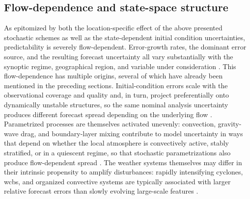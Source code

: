 \subsection{Flow-dependence and state-space structure}
\label{sec:intro_predictability_flowAndState}

As epitomized by both the location-specific effect of the above presented
stochastic schemes as well as the state-dependent initial condition
uncertainties, predictability is severely flow-dependent. Error-growth
rates, the dominant error source, and the resulting forecast uncertainty all
vary substantially with the synoptic regime, geographical region, and
variable under consideration \parencite{magnussonFactorsInfluencingSkill2013,
    ardilouzeFlowDependenceWintertime2021,
    rodwellCharacteristicsOccasionalPoor2013,
    ferrantiFlowdependentVerificationECMWF2015}. This flow-dependence has
multiple origins, several of which have already been mentioned in the
preceding sections. Initial-condition errors scale with the observational
coverage and quality and, in turn, project preferentially onto dynamically
unstable structures, so the same nominal analysis uncertainty produces
different forecast spread depending on the underlying flow
\parencite{buizzaTargetingObservationsUsing1999}. Parametrized processes are
themselves activated unevenly: convection, gravity-wave drag, and
boundary-layer mixing contribute to model uncertainty in ways that depend on
whether the local atmosphere is convectively active, stably stratified, or in
a quiescent regime, so that stochastic parametrizations also produce
flow-dependent spread \parencite{christensenParametrizationWeatherClimate2022}.
The weather systems themselves may differ in their intrinsic propensity to
amplify disturbances: rapidly intensifying cyclones, \glspl{wcb}, and
organized convective systems are typically associated with larger relative
forecast errors than slowly evolving large-scale features
\parencite{ferrantiFlowdependentVerificationECMWF2015,
    gramsAtmosphericDynamicsPerspective2018,
    clarkeDownstreamInfluenceMesoscale2019}.

